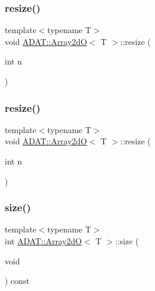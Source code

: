 \mbox{\label{classADAT_1_1Array2dO_aebe81d1fc5cdfea1b7a36effad3fb2e2}} 
\subsubsection{\texorpdfstring{resize()}{resize()}\hspace{0.1cm}{\footnotesize\ttfamily [3/4]}}
{\footnotesize\ttfamily template$<$typename T$>$ \\
void \mbox{\hyperlink{classADAT_1_1Array2dO}{A\+D\+A\+T\+::\+Array2dO}}$<$ T $>$\+::resize (\begin{DoxyParamCaption}\item[{int}]{n }\end{DoxyParamCaption})\hspace{0.3cm}{\ttfamily [inline]}}

\mbox{\label{classADAT_1_1Array2dO_aebe81d1fc5cdfea1b7a36effad3fb2e2}} 
\subsubsection{\texorpdfstring{resize()}{resize()}\hspace{0.1cm}{\footnotesize\ttfamily [4/4]}}
{\footnotesize\ttfamily template$<$typename T$>$ \\
void \mbox{\hyperlink{classADAT_1_1Array2dO}{A\+D\+A\+T\+::\+Array2dO}}$<$ T $>$\+::resize (\begin{DoxyParamCaption}\item[{int}]{n }\end{DoxyParamCaption})\hspace{0.3cm}{\ttfamily [inline]}}

\mbox{\label{classADAT_1_1Array2dO_a2f8311cdee5283e57e5d13887a463123}} 
\subsubsection{\texorpdfstring{size()}{size()}\hspace{0.1cm}{\footnotesize\ttfamily [1/2]}}
{\footnotesize\ttfamily template$<$typename T$>$ \\
int \mbox{\hyperlink{classADAT_1_1Array2dO}{A\+D\+A\+T\+::\+Array2dO}}$<$ T $>$\+::size (\begin{DoxyParamCaption}\item[{void}]{ }\end{DoxyParamCaption}) const\hspace{0.3cm}{\ttfamily [inline]}}

